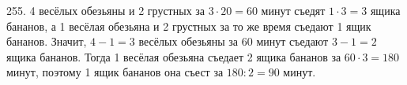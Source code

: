 255. 4 весёлых обезьяны и 2 грустных за $3\cdot20=60$ минут съедят $1\cdot3=3$ ящика бананов, а 1 весёлая обезьяна и 2 грустных за то же время съедают 1 ящик бананов. Значит, $4-1=3$ весёлых обезьяны за 60 минут съедают $3-1=2$ ящика бананов. Тогда 1 весёлая обезьяна съедает 2 ящика бананов за $60\cdot3=180$ минут, поэтому 1 ящик бананов она съест за $180:2=90$ минут.\\
